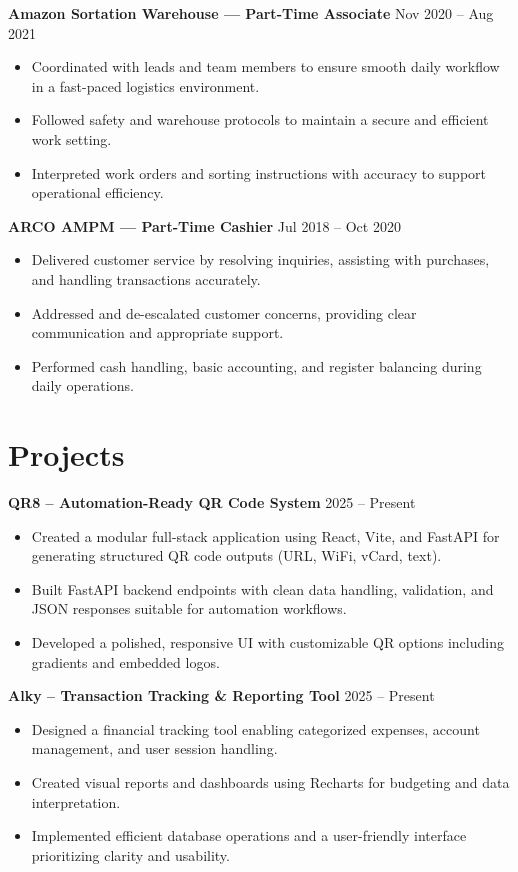 \documentclass[a4paper,10pt]{article}
\newcommand{\dateright}[1]{\hfill {\small\textnormal{#1}}}
\begin{document}
\textbf{Amazon Sortation Warehouse — Part-Time Associate} \dateright{Nov 2020 – Aug 2021}
\begin{itemize}
  \item Coordinated with leads and team members to ensure smooth daily workflow in a fast-paced logistics environment.
  \item Followed safety and warehouse protocols to maintain a secure and efficient work setting.
  \item Interpreted work orders and sorting instructions with accuracy to support operational efficiency.
\end{itemize}

\textbf{ARCO AMPM — Part-Time Cashier} \dateright{Jul 2018 – Oct 2020}
\begin{itemize}
  \item Delivered customer service by resolving inquiries, assisting with purchases, and handling transactions accurately.
  \item Addressed and de-escalated customer concerns, providing clear communication and appropriate support.
  \item Performed cash handling, basic accounting, and register balancing during daily operations.
\end{itemize}

\section*{Projects}

\textbf{QR8 – Automation-Ready QR Code System} \dateright{2025 – Present}
\begin{itemize}
  \item Created a modular full-stack application using React, Vite, and FastAPI for generating structured QR code outputs (URL, WiFi, vCard, text).
  \item Built FastAPI backend endpoints with clean data handling, validation, and JSON responses suitable for automation workflows.
  \item Developed a polished, responsive UI with customizable QR options including gradients and embedded logos.
\end{itemize}

\textbf{Alky – Transaction Tracking \& Reporting Tool} \dateright{2025 – Present}
\begin{itemize}
  \item Designed a financial tracking tool enabling categorized expenses, account management, and user session handling.
  \item Created visual reports and dashboards using Recharts for budgeting and data interpretation.
  \item Implemented efficient database operations and a user-friendly interface prioritizing clarity and usability.
\end{itemize}
\end{document}
